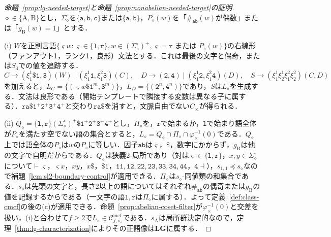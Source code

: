 \documentclass[11pt,a4paper]{ltjsarticle}
\numberwithin{equation}{section}
\theoremstyle{plain}
\theoremstyle{definition}
\theoremstyle{remark}
\newcommand{\Cmcf}[2]{\mathcal{C}^{\mathrm{mcf}}_{#1,#2}}
\begin{document}
\begin{proof}[命題~\ref{prop:lg-needed-target}と命題~\ref{prop:nonabelian-needed-target}の証明]
$\diamond\in\{\mathrm A,\mathrm B\}$とし，$\Sigma_\diamond^\circ$を$\{\mathtt a,\mathtt b,\mathtt c\}$または$\{\mathtt a,\mathtt b\}$，$P_\diamond(w)$を「$\#_{\mathtt{ab}}(w)$が偶数」または「$g_{\mathrm B}(w)=1$」とする．

(i) $W$を正則言語$\{\varsigma w:\varsigma\in\{\mathtt l,\mathtt r\},w\in(\Sigma_\diamond^\circ)^+,\varsigma=\mathtt r\text{ または }P_\diamond(w)\}$の右線形（ファンアウト1，ランク1，良形）文法とする．これは最後の文字と偶奇，または$S_3$での値を追跡する．
\[
 C\to(\xi_1^1\mathtt\$\mathtt 1,\mathtt 3)(W)\mid(\xi_1^1\mathtt 1,\xi_1^2\mathtt 3)(C),\quad
 D\to(\mathtt 2,\mathtt 4)\mid(\xi_1^1\mathtt 2,\xi_1^2\mathtt 4)(D),\quad
 S\to(\xi_1^1\xi_2^1\xi_1^2\xi_2^2)(C,D)
\]
を加えると，$L_C=\{(\varsigma w\mathtt\$\mathtt 1^m,\mathtt 3^m)\}$，$L_D=\{(\mathtt 2^n,\mathtt 4^n)\}$であり，$S$は$L_\diamond$を生成する．文法は良形である（開始テンプレートで隣接する変数は異なる子に属する）．$\mathtt{ra\$}\mathtt 1^+\mathtt 2^+\mathtt 3^+\mathtt 4^+$と交わり$\mathtt{ra\$}$を消すと，文脈自由でない$C_\times$が得られる．

(ii) $Q_\diamond=\{\mathtt l,\mathtt r\}(\Sigma_\diamond^\circ)^+\mathtt\$\mathtt 1^+\mathtt 2^+\mathtt 3^+\mathtt 4^+$とし，$\Pi_\diamond$を，$\mathtt r$で始まるか，$\mathtt l$で始まり語全体が$P_\diamond$を満たす空でない語の集合とすると，$L_\diamond=Q_\diamond\cap\Pi_\diamond\cap\varphi_\times^{-1}(0)$である．$Q_\diamond$上では語全体の$P_\diamond$は$w$の$P_\diamond$に等しい．因子$\mathtt{ab}$は$\varsigma$，$\mathtt\$$，数字にかからず，$g_{\mathrm B}$は他の文字で自明だからである．$Q_\diamond$は狭義2-局所であり（対は$\varsigma\in\{\mathtt l,\mathtt r\}$，$x,y\in\Sigma_\diamond^\circ$について$\vdash\varsigma$，$\varsigma x$，$xy$，$x\mathtt\$$，$\mathtt{\$1}$，$\mathtt{11},\mathtt{12},\mathtt{22},\mathtt{23},\mathtt{33},\mathtt{34},\mathtt{44}$，$\mathtt 4\dashv$），$s_{1,1}\preceq s_\diamond$なので補題~\ref{lem:sl2-boundary-control}が適用できる．$\Pi_\diamond$は$s_\diamond$-同値類の和集合である．$s_\diamond$は先頭の文字と，長さ2以上の語についてはそれぞれ$\#_{\mathtt{ab}}$の偶奇または$g_{\mathrm B}$の値を記録するからである（一文字の語$\mathtt l,\mathtt r$は$\Pi_\diamond$に属する）．よって定義~\ref{def:class-cmcf}の後の(c)が適用できる．命題~\ref{prop:abelian-coset-filter}が$\varphi_\times^{-1}(0)$と交差を扱い，(i)と合わせて$f\ge2$で$L_\diamond\in\Cmcf{f}{s_\diamond}$である．$s_{\mathrm A}$は局所群決定的なので，定理~\ref{thm:lg-characterization}によりその正語像は$\mathbf{LG}$に属する．


\end{proof}
\end{document}
